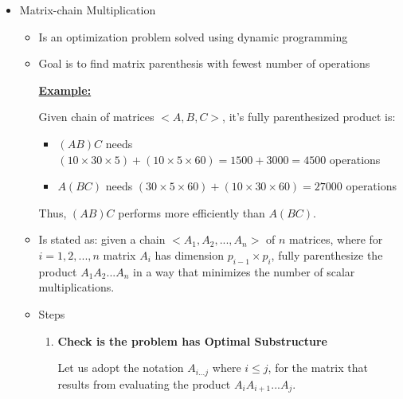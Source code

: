 \documentclass[12pt]{article}
\begin{document}
\begin{enumerate}[1.]
\begin{itemize}
        \bigskip

        \item Matrix-chain Multiplication

        \begin{itemize}
            \item Is an optimization problem solved using dynamic programming
            \item Goal is to find matrix parenthesis with fewest number of operations

            \bigskip

            \underline{\textbf{Example:}}

            \bigskip

            Given chain of matrices $<A,B,C>$, it's fully parenthesized product is:

            \bigskip

            \begin{itemize}
                \item $(AB)C$ needs $(10 \times 30 \times 5) + (10 \times 5 \times 60) = 1500 + 3000 = 4500$ operations
                \item $A(BC)$ needs $(30 \times 5 \times 60) + (10 \times 30 \times 60) = 27000$ operations
            \end{itemize}

            \bigskip

            Thus, $(AB)C$ performs more efficiently than $A(BC)$.

            \bigskip

            \item Is stated as: given a chain $<A_1, A_2, ..., A_n>$ of $n$ matrices,
            where for $i = 1,2,...,n$ matrix $A_i$ has dimension $p_{i-1} \times p_i$,
            fully parenthesize the product $A_1A_2...A_n$ in a way that minimizes the number of scalar multiplications.

            \item Steps

            \begin{enumerate}[1.]
                \item \textbf{Check is the problem has Optimal Substructure}

                \bigskip

                Let us adopt the notation $A_{i...j}$ where $i \leq j$, for the matrix
                that results from evaluating the product $A_iA_{i+1}...A_j$.


\end{enumerate}
\end{itemize}
\end{itemize}
\end{enumerate}
\end{document}
